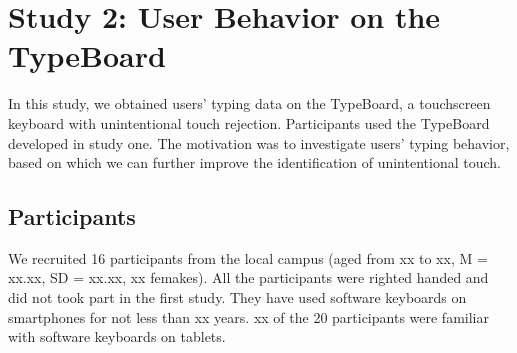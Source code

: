 \section{Study 2: User Behavior on the TypeBoard}

In this study, we obtained users' typing data on the TypeBoard, a touchscreen keyboard with unintentional touch rejection. Participants used the TypeBoard developed in study one. The motivation was to investigate users' typing behavior, based on which we can further improve the identification of unintentional touch.


\subsection{Participants}

We recruited 16 participants from the local campus (aged from xx to xx, M = xx.xx, SD = xx.xx, xx femakes). All the participants were righted handed and did not took part in the first study. They have used software keyboards on smartphones for not less than xx years. xx of the 20 participants were familiar with software keyboards on tablets.



